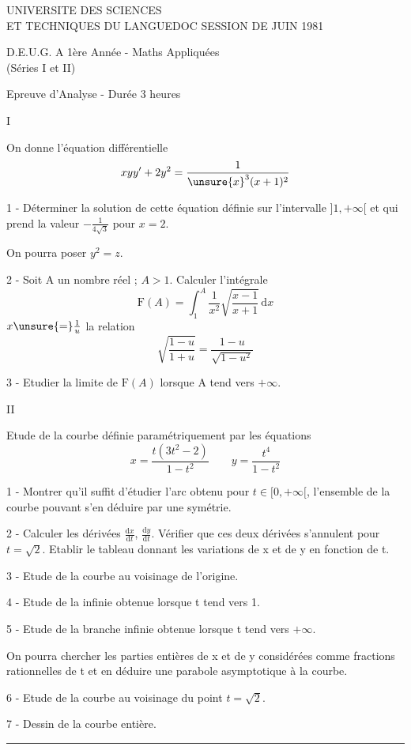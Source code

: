 
UNIVERSITE DES SCIENCES\\
ET TECHNIQUES DU LANGUEDOC
\hfill SESSION DE JUIN 1981

\begin{center}
D.E.U.G. A 1ère Année - Maths Appliquées\\
(Séries I et II)

Epreuve d'Analyse - Durée 3 heures

I
\end{center}

On donne l'équation différentielle
\[
xyy'+2y^2=\frac{1}{\unsure{x}^3(x+1)^2}
\]

1 - Déterminer la solution de cette équation définie sur l'intervalle $]1,+\infty[$
et qui prend la valeur $-\frac{1}{4\sqrt3}$ pour $x=2$.

On pourra poser $y^2=z$.

2 - Soit A un nombre réel ; $A>1$. Calculer l'intégrale
\[
\mathrm F(A)=\int_1^A\frac{1}{x^2}\sqrt{\frac{x-1}{x+1}}\,\mathrm dx
\]
 $x\unsure{=}\frac1u$  la relation
\[
\sqrt{\frac{1-u}{1+u}}=\frac{1-u}{\sqrt{1-u^2}}
\]

3 - Etudier la limite de $\mathrm F(A)$ lorsque A tend vers $+\infty$.

\begin{center}II\end{center}

Etude de la courbe définie paramétriquement par les équations
\[
x=\frac{t(3t^2-2)}{1-t^2}
\qquad
y=\frac{t^4}{1-t^2}
\]

1 - Montrer qu'il suffit d'étudier l'arc obtenu pour $t\in[0,+\infty[$,
l'ensemble de la courbe pouvant s'en déduire par une symétrie.

2 - Calculer les dérivées $\frac{\mathrm dx}{\mathrm dt}$, $\frac{\mathrm dy}{\mathrm dt}$.
Vérifier que ces deux dérivées s'annulent pour $t=\sqrt2$.
Etablir le tableau donnant les variations de x et de y en fonction de t.

3 - Etude de la courbe au voisinage de l'origine.

4 - Etude de la  infinie obtenue lorsque t tend vers 1.

5 - Etude de la branche infinie obtenue lorsque t tend vers $+\infty$.

On pourra chercher les parties entières de x et de y considérées
comme fractions rationnelles de t et en déduire une parabole asymptotique à la
courbe.

6 - Etude de la courbe au voisinage du point $t=\sqrt2$.

7 - Dessin de la courbe entière.

\begin{center}\rule{1.5cm}{.4pt}\end{center}

